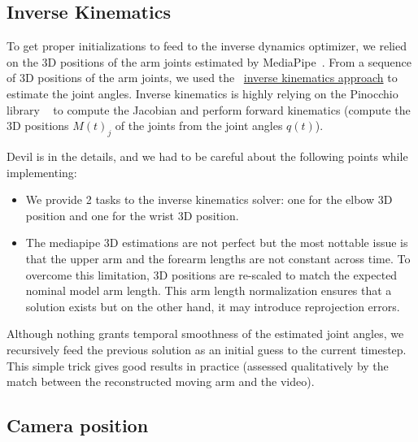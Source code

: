 \subsection{Inverse Kinematics}
\label{subsec:inverse_kinematics}
To get proper initializations to feed to the inverse dynamics optimizer, we relied on the 3D positions of the arm joints estimated by MediaPipe~\cite{lugaresi2019mediapipe}.
From a sequence of 3D positions of the arm joints, we used the 
~\href{https://github.com/balthazarneveu/monocular_pose_and_forces_estimation/blob/main/src/projectyl/dynamics/inverse_kinematics.py}{inverse kinematics approach} to estimate the joint angles.
Inverse kinematics is highly relying on the Pinocchio library ~\cite{carpentier2019pinocchio} to compute 
the Jacobian and perform forward kinematics (compute the 3D positions  $M(t)_{j}$ of the joints from the joint angles $q(t)$).

Devil is in the details, and we had to be careful about the following points while implementing:
\begin{itemize}
    \item We provide 2 tasks to the inverse kinematics solver: one for the elbow 3D position and one for the wrist 3D position.
    \item The mediapipe 3D estimations are not perfect but the most nottable issue is that 
    the upper arm and the forearm lengths are not constant across time. To overcome this limitation,
    3D positions are re-scaled to match the expected nominal model arm length.
    This arm length normalization ensures that a solution exists but on the other hand, it may introduce reprojection errors.
\end{itemize}
Although nothing grants temporal smoothness of the estimated joint angles, we recursively feed the previous solution as an initial guess to the current timestep.
This simple trick gives good results in practice (assessed qualitatively by the match between the reconstructed moving arm and the video).


\subsection{Camera position}
\label{subsec:cam_estim}

